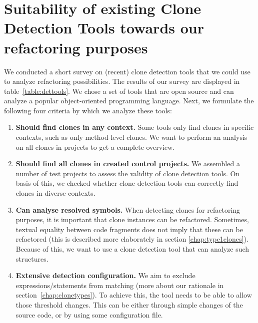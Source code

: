 \section{Suitability of existing Clone Detection Tools towards our refactoring purposes}
\label{ch:tool-overview}
We conducted a short survey on (recent) clone detection tools that we could use to analyze refactoring possibilities. The results of our survey are displayed in table~\ref{table:dettools}. We chose a set of tools that are open source and can analyze a popular object-oriented programming language. Next, we formulate the following four criteria by which we analyze these tools:
\begin{enumerate}
    \item \textbf{Should find clones in any context.} Some tools only find clones in specific contexts, such as only method-level clones. We want to perform an analysis on all clones in projects to get a complete overview.
\item \textbf{Should find all clones in created control projects.} We assembled a number of test projects to assess the validity of clone detection tools. On basis of this, we checked whether clone detection tools can correctly find clones in diverse contexts.
\item \textbf{Can analyse resolved symbols.} When detecting clones for refactoring purposes, it is important that clone instances can be refactored. Sometimes, textual equality between code fragments does not imply that these can be refactored (this is described more elaborately in section \ref{chap:type1clones}). Because of this, we want to use a clone detection tool that can analyze such structures.
\item \textbf{Extensive detection configuration.} We aim to exclude expressions/statements from matching (more about our rationale in section~\ref{chap:clonetypes}). To achieve this, the tool needs to be able to allow those threshold changes. This can be either through simple changes of the source code, or by using some configuration file.
\end{enumerate}

